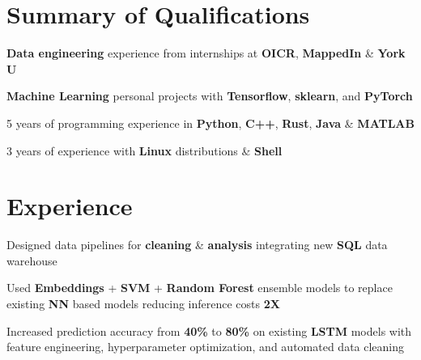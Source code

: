 \documentclass[]{chandan-cv}
\begin{document}
\begin{minipage}[t]{0.71\textwidth}


\section{Summary of Qualifications}
\runsubsection{ }
\descript{ }
\location{ }
\vspace{\topsep} %
\begin{tightemize}
	\item \textbf{Data engineering} experience from internships at \textbf{OICR}, \textbf{MappedIn} \& \textbf{York U}
	\item \textbf{Machine Learning} personal projects with \textbf{Tensorflow}, \textbf{sklearn}, and \textbf{PyTorch}
	\item 5 years of programming experience in \textbf{Python}, \textbf{C++}, \textbf{Rust}, \textbf{Java} \& \textbf{MATLAB}
	\item 3 years of experience with \textbf{Linux} distributions \& \textbf{Shell}
\end{tightemize}
\sectionsep


\section{Experience}

\begin{tightemize}
        \item Designed data pipelines for \textbf{cleaning} \& \textbf{analysis} integrating new \textbf{SQL} data warehouse
        \item Used \textbf{Embeddings} + \textbf{SVM} + \textbf{Random Forest} ensemble models to replace existing \textbf{NN} based models reducing inference costs \textbf{2X}
	\item Increased prediction accuracy from \textbf{40\%} to \textbf{80\%} on existing \textbf{LSTM} models with feature engineering, hyperparameter optimization, and automated data cleaning
\end{tightemize}
\sectionsep


\end{minipage}
\end{document}
